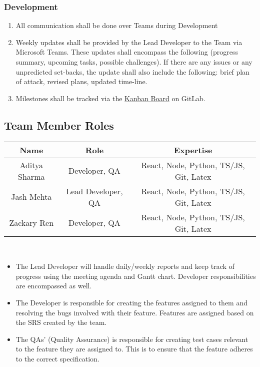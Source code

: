 \documentclass[11pt, oneside]{article}   	%
\begin{document}
\subsubsection*{Development}
\begin{enumerate}
\item All communication shall be done over Teams during Development
\item Weekly updates shall be provided by the Lead Developer to the Team via Microsoft Teams. These updates shall encompass the following (progress summary, upcoming tasks, possible challenges). If there are any issues or any unpredicted set-backs, the update shall also include the following: brief plan of attack, revised plans, updated time-line.
\item Milestones shall be tracked via the \href{https://gitlab.cas.mcmaster.ca/renx11/3xa3-project-l02-group9/-/boards}{Kanban Board} on GitLab.
\end{enumerate}


\newpage
\subsection*{Team Member Roles}
\begin{tabular}{ | c | c | c |}
\hline
Name & Role & Expertise \\
\hline
Aditya Sharma & Developer, QA & React, Node, Python, TS/JS, Git, Latex\\
\hline
Jash Mehta & Lead Developer, QA & React, Node, Python, TS/JS, Git, Latex\\
\hline
Zackary Ren & Developer, QA & React, Node, Python, TS/JS, Git, Latex\\
\hline
\end{tabular}
\\
\begin{itemize}
\item The Lead Developer will handle daily/weekly reports and keep track of progress using the meeting agenda and Gantt chart. Developer responsibilities are encompassed as well.\\

\item The Developer is responsible for creating the features assigned to them and resolving the bugs involved with their feature. Features are assigned based on the SRS created by the team.\\

\item The QAs' (Quality Assurance) is responsible for creating test cases relevant to the feature they are assigned to. This is to ensure that the feature adheres to the correct specification.\\
\end{itemize}
\end{document}
